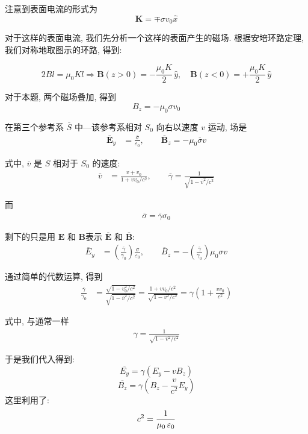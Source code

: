 注意到表面电流的形式为
\[
\mathbf K = \mp \sigma v_0 \hat x
\]

对于这样的表面电流, 我们先分析一个这样的表面产生的磁场. 根据安培环路定理, 我们对称地取图示的环路, 得到:

\[
2Bl = \mu_0Kl \Rightarrow\mathbf B(z>0)=-\dfrac{\mu_0 K}{2}\,\hat y,\quad \mathbf B(z<0)=+\dfrac{\mu_0 K}{2}\,\hat y
\]

对于本题, 两个磁场叠加, 得到
\[
B_z = -\mu_0 \sigma v_0
\]

在第三个参考系 $\overline{S}$ 中---该参考系相对 $S_0$ 向右以速度 $v$ 运动, 场是
\begin{align*}
\overline{\mathbf E}_y &= \frac{\overline{\sigma}}{\varepsilon_0}, \qquad
\overline{\mathbf B}_z = -\mu_0 \overline{\sigma} v
\end{align*}

式中, $\overline v$ 是 $S$ 相对于 $S_0$ 的速度:
\begin{align*}
\overline v &= \frac{v + v_0}{1 + v v_0 / c^2},
\qquad
\overline{\gamma} = \frac{1}{\sqrt{1 - \overline v^2 / c^2}}
\end{align*}

而
\begin{align*}
\overline \sigma = \overline \gamma \sigma_0
\end{align*}

剩下的只是用 $\mathbf E$ 和 $\mathbf B$表示
$\overline{\mathbf E}$ 和 $\overline{\mathbf B}$:
\begin{align*}
\overline E_y &= \left(\frac{\overline{\gamma}}{\gamma_0}\right)\frac{\sigma}{\varepsilon_0},
\qquad
\overline B_z = -\left(\frac{\overline{\gamma}}{\gamma_0}\right)\mu_0 \sigma v
\end{align*}

通过简单的代数运算, 得到
\begin{align*}
\frac{\overline{\gamma}}{\gamma_0}
&= \frac{\sqrt{1 - v_0^2 / c^2}}{\sqrt{1 - \overline v^2 / c^2}}
   = \frac{1 + v v_0 / c^2}{\sqrt{1 - v^2 / c^2}}
   = \gamma \left( 1 + \frac{v v_0}{c^2} \right)
\end{align*}

式中, 与通常一样
\begin{align*}
\gamma = \frac{1}{\sqrt{1 - v^2 / c^2}}
\end{align*}

于是我们代入得到:
\[
\overline{E_y} = \gamma(E_y-vB_z)
\]
\[
\overline{B_z} = \gamma(B_z-\frac{v}{c^2}E_y)
\]
这里利用了:
\[
c^2 = \frac{1}{\mu_0\mathop{}\!\varepsilon_0}
\]

